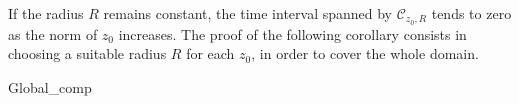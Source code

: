 		If the radius $ R $ remains constant, the time interval spanned by $ \mathcal{C}_{z_0, R} $ tends to zero as the norm of $ z_0 $ increases. The proof of the following corollary consists in choosing a suitable radius $ R $ for each $ z_0 $, in order to cover the whole domain.
		
		{Global_comp}
		